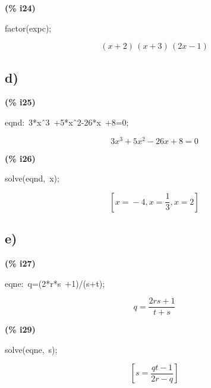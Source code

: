 \documentclass[fleqn]{article}
\begin{document}
\noindent
\begin{minipage}[t]{4.000000em}\color{red}\bfseries
(\% i24)	
\end{minipage}
\begin{minipage}[t]{\textwidth}\color{blue}
factor(expc);
\end{minipage}
\[\displaystyle \tag{\% o24} 
\left( x\mathop{+}2\right) \, \left( x\mathop{+}3\right) \, \left( 2 x\mathop{-}1\right) \mbox{}
\]

\subsection{d)}


\noindent
\begin{minipage}[t]{4.000000em}\color{red}\bfseries
(\% i25)	
\end{minipage}
\begin{minipage}[t]{\textwidth}\color{blue}
eqnd:\ 3*x\^\ 3\ +5*x\^\ 2-26*x\ +8=0;
\end{minipage}
\[\displaystyle \tag{eqnd} 
3 {{x}^{3}}\mathop{+}5 {{x}^{2}}\mathop{-}26 x\mathop{+}8\mathop{=}0\mbox{}
\]


\noindent
\begin{minipage}[t]{4.000000em}\color{red}\bfseries
(\% i26)	
\end{minipage}
\begin{minipage}[t]{\textwidth}\color{blue}
solve(eqnd,\ x);
\end{minipage}
\[\displaystyle \tag{\% o26} 
\left[ x\mathop{=}\mathop{-}4\mathop{,}x\mathop{=}\frac{1}{3}\mathop{,}x\mathop{=}2\right] \mbox{}
\]

\subsection{e)}


\noindent
\begin{minipage}[t]{4.000000em}\color{red}\bfseries
(\% i27)	
\end{minipage}
\begin{minipage}[t]{\textwidth}\color{blue}
eqne:\ q=(2*r*s\ +1)/(s+t);
\end{minipage}
\[\displaystyle \tag{eqne} 
q\mathop{=}\frac{2 r s\mathop{+}1}{t\mathop{+}s}\mbox{}
\]


\noindent
\begin{minipage}[t]{4.000000em}\color{red}\bfseries
(\% i29)	
\end{minipage}
\begin{minipage}[t]{\textwidth}\color{blue}
solve(eqne,\ s);
\end{minipage}
\[\displaystyle \tag{\% o29} 
\left[ s\mathop{=}\frac{q t\mathop{-}1}{2 r\mathop{-}q}\right] \mbox{}
\]
\end{document}
